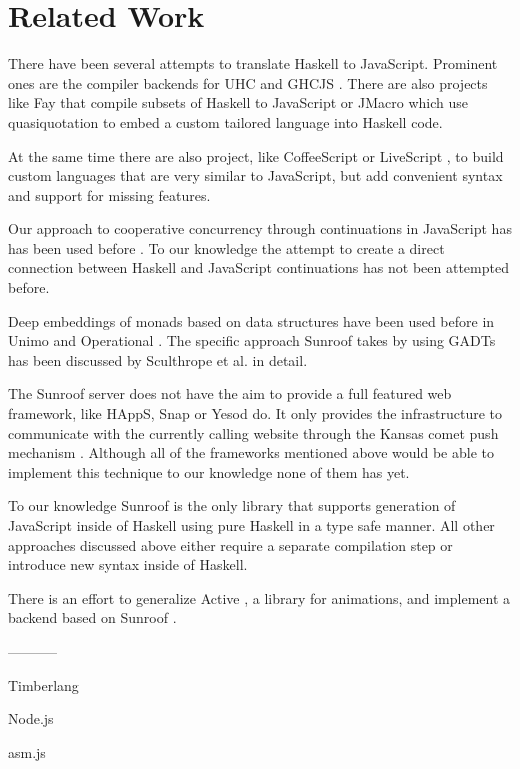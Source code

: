  
\section{Related Work}

There have been several attempts to translate Haskell to JavaScript.
Prominent ones are the compiler backends for 
UHC \cite{Stutterheim:12:ImprovingUHCJavaScriptBackend} and 
GHCJS \cite{project:ghcjs}. There are also projects like Fay \cite{project:fay} 
that compile subsets of Haskell to JavaScript or JMacro \cite{project:jmacro}
which use quasiquotation \cite{Mainland:07:QuasiquotingHaskell} to embed 
a custom tailored language into Haskell code.

At the same time there are also project, like 
CoffeeScript \cite{project:coffeescript} or LiveScript \cite{project:livescript},
to build custom languages 
that are very similar to JavaScript, but add convenient syntax and
support for missing features.

Our approach to cooperative concurrency through continuations in JavaScript has
has been used before 
\cite{Cooper:07:LinksWebProgrammingTiers,Predescu:02:CocoonContinuationBasedControlFlow}.
To our knowledge the attempt to create a direct connection
between Haskell and JavaScript continuations has not been 
attempted before.

Deep embeddings of monads based on data structures have been used before
in Unimo \cite{Lin:06:Unimo} and Operational \cite{Apfelmus:10:Operational,Hackage:10:Operational}. 
The specific approach Sunroof takes 
by using GADTs has been discussed by 
Sculthrope et al. \cite{Sculthorpe:13:ConstrainedMonads} 
in detail.

The Sunroof server does not have the aim to provide a full featured 
web framework, like HAppS, Snap or Yesod do. It only provides 
the infrastructure to communicate with the currently calling website
through the Kansas comet \cite{project:kansas-comet} 
push mechanism \cite{pattern:push}. Although all of the
frameworks mentioned above would be able to implement this technique
to our knowledge none of them has yet.

To our knowledge Sunroof is the only library that supports 
generation of JavaScript inside of Haskell using pure Haskell
in a type safe manner. All other approaches discussed above
either require a separate compilation step or introduce new 
syntax inside of Haskell. 

There is an effort to generalize Active \cite{project:active}, a library for animations, and
implement a backend based on Sunroof \cite{project:sunroof-active}.

-----------

Timberlang


Node.js 

asm.js 



